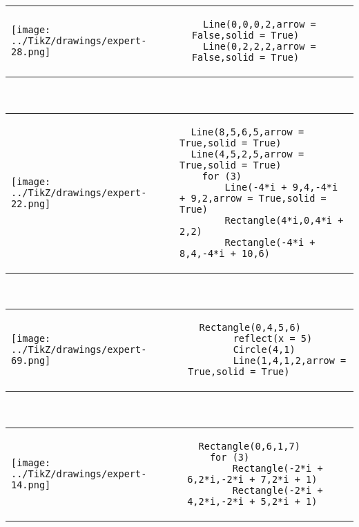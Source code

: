         \begin{tabular}{ll}
\texttt{[image: ../TikZ/drawings/expert-28.png]}&
        \begin{minipage}{10cm}
        \begin{verbatim}
  Line(0,0,0,2,arrow = False,solid = True)
  Line(0,2,2,2,arrow = False,solid = True)
        \end{verbatim}
\end{minipage}
\end{tabular}        
        \\

        \begin{tabular}{ll}
\texttt{[image: ../TikZ/drawings/expert-22.png]}&
        \begin{minipage}{10cm}
        \begin{verbatim}
  Line(8,5,6,5,arrow = True,solid = True)
  Line(4,5,2,5,arrow = True,solid = True)
    for (3)
        Line(-4*i + 9,4,-4*i + 9,2,arrow = True,solid = True)
        Rectangle(4*i,0,4*i + 2,2)
        Rectangle(-4*i + 8,4,-4*i + 10,6)
        \end{verbatim}
\end{minipage}
\end{tabular}        
        \\

        \begin{tabular}{ll}
\texttt{[image: ../TikZ/drawings/expert-69.png]}&
        \begin{minipage}{10cm}
        \begin{verbatim}
  Rectangle(0,4,5,6)
        reflect(x = 5)
        Circle(4,1)
        Line(1,4,1,2,arrow = True,solid = True)
        \end{verbatim}
\end{minipage}
\end{tabular}        
        \\

        \begin{tabular}{ll}
\texttt{[image: ../TikZ/drawings/expert-14.png]}&
        \begin{minipage}{10cm}
        \begin{verbatim}
  Rectangle(0,6,1,7)
    for (3)
        Rectangle(-2*i + 6,2*i,-2*i + 7,2*i + 1)
        Rectangle(-2*i + 4,2*i,-2*i + 5,2*i + 1)
        \end{verbatim}
\end{minipage}
\end{tabular}        
        \\

